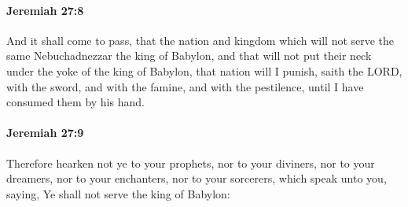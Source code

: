 		\paragraph{Jeremiah 27:8} %
			\label{JEREMIAH-27-8}

			And it shall come to pass, that the nation and kingdom which will not serve the same Nebuchadnezzar the king of Babylon, and that will not put their neck under the yoke of the king of Babylon, that nation will I punish, saith the LORD, with the sword, and with the famine, and with the pestilence, until I have consumed them by his hand.


		\paragraph{Jeremiah 27:9} %
			\label{JEREMIAH-27-9}

			Therefore hearken not ye to your prophets, nor to your diviners, nor to your dreamers, nor to your enchanters, nor to your sorcerers, which speak unto you, saying, Ye shall not serve the king of Babylon:

